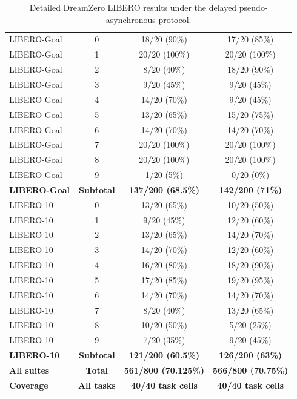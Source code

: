 \begin{table}[H]
{\begin{tabular}{lccc}
        \midrule
        LIBERO-Goal & 0 & 18/20 (90\%) & 17/20 (85\%) \\
        LIBERO-Goal & 1 & 20/20 (100\%) & 20/20 (100\%) \\
        LIBERO-Goal & 2 & 8/20 (40\%) & 18/20 (90\%) \\
        LIBERO-Goal & 3 & 9/20 (45\%) & 9/20 (45\%) \\
        LIBERO-Goal & 4 & 14/20 (70\%) & 9/20 (45\%) \\
        LIBERO-Goal & 5 & 13/20 (65\%) & 15/20 (75\%) \\
        LIBERO-Goal & 6 & 14/20 (70\%) & 14/20 (70\%) \\
        LIBERO-Goal & 7 & 20/20 (100\%) & 20/20 (100\%) \\
        LIBERO-Goal & 8 & 20/20 (100\%) & 20/20 (100\%) \\
        LIBERO-Goal & 9 & 1/20 (5\%) & 0/20 (0\%) \\
        \textbf{LIBERO-Goal} & \textbf{Subtotal} & \textbf{137/200 (68.5\%)} & \textbf{142/200 (71\%)} \\
        \midrule
        LIBERO-10 & 0 & 13/20 (65\%) & 10/20 (50\%) \\
        LIBERO-10 & 1 & 9/20 (45\%) & 12/20 (60\%) \\
        LIBERO-10 & 2 & 13/20 (65\%) & 14/20 (70\%) \\
        LIBERO-10 & 3 & 14/20 (70\%) & 12/20 (60\%) \\
        LIBERO-10 & 4 & 16/20 (80\%) & 18/20 (90\%) \\
        LIBERO-10 & 5 & 17/20 (85\%) & 19/20 (95\%) \\
        LIBERO-10 & 6 & 14/20 (70\%) & 14/20 (70\%) \\
        LIBERO-10 & 7 & 8/20 (40\%) & 13/20 (65\%) \\
        LIBERO-10 & 8 & 10/20 (50\%) & 5/20 (25\%) \\
        LIBERO-10 & 9 & 7/20 (35\%) & 9/20 (45\%) \\
        \textbf{LIBERO-10} & \textbf{Subtotal} & \textbf{121/200 (60.5\%)} & \textbf{126/200 (63\%)} \\
        \midrule
        \textbf{All suites} & \textbf{Total} & \textbf{561/800 (70.125\%)} & \textbf{566/800 (70.75\%)} \\
        \textbf{Coverage} & \textbf{All tasks} & \textbf{40/40 task cells} & \textbf{40/40 task cells} \\
        \bottomrule
    \end{tabular}}
    \caption{Detailed DreamZero LIBERO results under the delayed
    pseudo-asynchronous protocol.}
    \label{tab:dreamzero-libero-detailed}
\end{table}
